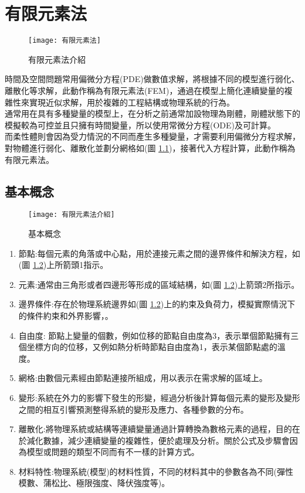 \chapter{有限元素法}

\begin{figure}[hbt!]
\begin{center}
\texttt{[image: 有限元素法]}
\caption{\Large 有限元素法介紹}\label{有限元素法}
\end{center}
\end{figure}
時間及空間問題常用偏微分方程(PDE)做數值求解，將根據不同的模型進行弱化、離散化等求解，此動作稱為有限元素法(FEM)，通過在模型上簡化連續變量的複雜性來實現近似求解，用於複雜的工程結構或物理系統的行為。\\
通常用在具有多種變量的模型上，在分析之前通常加設物理為剛體，剛體狀態下的模擬較為可控並且只擁有時間變量，所以使用常微分方程(ODE)及可計算。\\
而柔性體則會因為受力情況的不同而產生多種變量，才需要利用偏微分方程求解，對物體進行弱化、離散化並劃分網格如(圖 \ref{有限元素法})，接著代入方程計算，此動作稱為有限元素法。\\
\newpage
\section{基本概念}

\begin{figure}[hbt!]
\begin{center}
\texttt{[image: 有限元素法介紹]}
\caption{\Large 基本概念}\label{有限元素法介紹}
\end{center}
\end{figure}

\begin{enumerate}
\item 節點:每個元素的角落或中心點，用於連接元素之間的邊界條件和解決方程，如(圖 \ref{有限元素法介紹})上所箭頭1指示。
\item 元素:通常由三角形或者四邊形等形成的區域結構，如(圖 \ref{有限元素法介紹})上箭頭2所指示。
\item 邊界條件:存在於物理系統邊界如(圖 \ref{有限元素法介紹})上的約束及負荷力，模擬實際情況下的條件約束和外界影響，。
\item 自由度: 節點上變量的個數，例如位移的節點自由度為3，表示單個節點擁有三個坐標方向的位移，又例如熱分析時節點自由度為1，表示某個節點處的溫度。
\item 網格:由數個元素經由節點連接所組成，用以表示在需求解的區域上。
\item 變形:系統在外力的影響下發生的形變，經過分析後計算每個元素的變形及變形之間的相互引響預測整得系統的變形及應力、各種參數的分布。
\item 離散化:將物理系統或結構等連續變量通過計算轉換為數格元素的過程，目的在於減化數據，減少連續變量的複雜性，便於處理及分析。關於公式及步驟會因為模型或問題的類型不同而有不一樣的計算方式。
\item 材料特性:物理系統(模型)的材料性質，不同的材料其中的參數各為不同(彈性模數、蒲松比、極限強度、降伏強度等)。\\
\end{enumerate}

